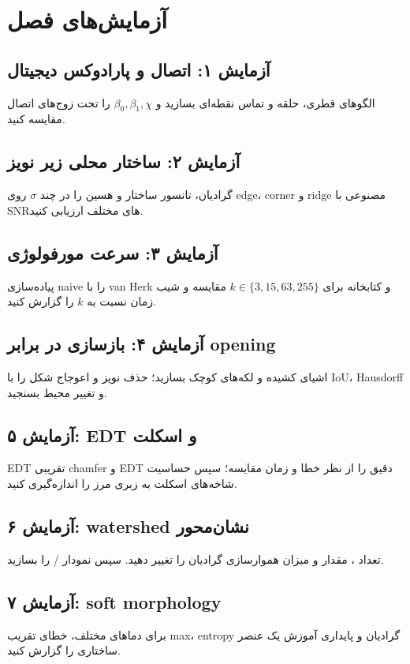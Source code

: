 \documentclass[12pt,openany,oneside]{book}
\begin{document}
\section{آزمایش‌های فصل}
\subsection{آزمایش ۱: اتصال و پارادوکس دیجیتال}
الگوهای قطری، حلقه و تماس نقطه‌ای بسازید و \(\beta_0,\beta_1,\chi\) را تحت زوج‌های اتصال مقایسه کنید.

\subsection{آزمایش ۲: ساختار محلی زیر نویز}
گرادیان، تانسور ساختار و هسین را در چند \(\sigma\) روی edge، corner و ridge مصنوعی با SNRهای مختلف ارزیابی کنید.

\subsection{آزمایش ۳: سرعت مورفولوژی}
پیاده‌سازی naive را با van Herk و کتابخانه برای \(k\in\{3,15,63,255\}\) مقایسه و شیب زمان نسبت به \(k\) را گزارش کنید.

\subsection{آزمایش ۴: بازسازی در برابر opening}
اشیای کشیده و لکه‌های کوچک بسازید؛ حذف نویز و اعوجاج شکل را با IoU، Hausdorff و تغییر محیط بسنجید.

\subsection{آزمایش ۵: EDT و اسکلت}
EDT تقریبی chamfer و EDT دقیق را از نظر خطا و زمان مقایسه؛ سپس حساسیت شاخه‌های اسکلت به زبری مرز را اندازه‌گیری کنید.

\subsection{آزمایش ۶: watershed نشان‌محور}
تعداد ، مقدار  و میزان هموارسازی گرادیان را تغییر دهید. سپس نمودار
/ را بسازید.

\subsection{آزمایش ۷: soft morphology}
برای دماهای مختلف، خطای تقریب max، entropy گرادیان و پایداری آموزش یک عنصر ساختاری را گزارش کنید.
\end{document}

